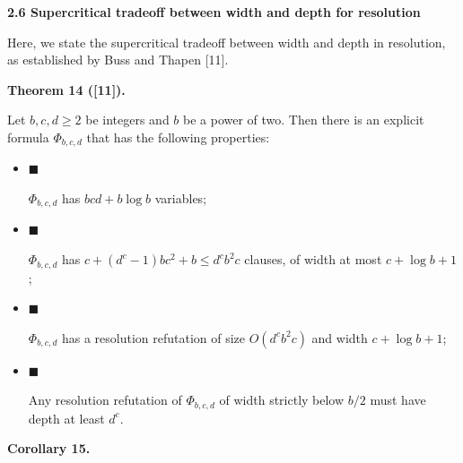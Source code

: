 \documentclass[10pt,a4paper]{article}
\begin{document}
\par\medskip\noindent\textbf{
2.6 Supercritical tradeoff between width and depth for resolution}\par


Here, we state the supercritical tradeoff between width and depth in resolution,
as established by Buss and Thapen [11].\par



\par\medskip\noindent\textbf{
Theorem 14 ([11]).
}\par



Let $b,c,d\geq 2$ be integers and $b$ be a power of two.
Then there is an explicit formula $\Phi_{b,c,d}$ that has the following properties:\par


\begin{itemize}


\item 
$\blacksquare$ 


$\Phi_{b,c,d}$ has $bcd+b\log b$ variables;\par





\item 
$\blacksquare$ 


$\Phi_{b,c,d}$ has $c+(d^{c}-1)bc^{2}+b\leq d^{c}b^{2}c$ clauses, of width at most $c+\log b+1$;\par





\item 
$\blacksquare$ 


$\Phi_{b,c,d}$ has a resolution refutation of size $O(d^{c}b^{2}c)$ and width $c+\log b+1$;\par





\item 
$\blacksquare$ 


Any resolution refutation of $\Phi_{b,c,d}$ of width strictly below $b/2$ must have depth at least $d^{c}$.\par





\end{itemize}




\par\medskip\noindent\textbf{
Corollary 15.
}\par
\end{document}
